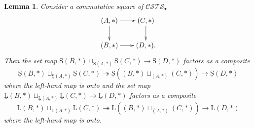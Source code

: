 \documentclass[a4paper,12pt]{amsart}
\newtheorem{lem}[thm]{Lemma}
\begin{document}
\begin{lem} \label{aide} Consider a commutative square of ${\mathcal{C\!S\!T\!S}}_\bullet$
\[
\xymatrix@C=2em@R=2em
{
(A,*) {\ar@{->}[r]^-{{}}} {\ar@{->}[d]_-{{}}} & (C,*) {\ar@{->}[d]_-{{}}}\\
(B,*) {\ar@{->}[r]^-{{}}} & (D,*).
}
\]
Then the set map $\operatorname{\underline{S}}(B,*) \sqcup_{\operatorname{\underline{S}}(A,*)} \operatorname{\underline{S}}(C,*) \to \operatorname{\underline{S}}(D,*)$
factors as a composite
\[\operatorname{\underline{S}}(B,*) \sqcup_{\operatorname{\underline{S}}(A,*)} \operatorname{\underline{S}}(C,*) \twoheadrightarrow \operatorname{\underline{S}}((B,*)
\sqcup_{(A,*)} (C,*)) \longrightarrow \operatorname{\underline{S}}(D,*)\] where the left-hand
map is onto and the set map $\operatorname{\underline{L}}(B,*) \sqcup_{\operatorname{\underline{L}}(A,*)} \operatorname{\underline{L}}(C,*) \to
\operatorname{\underline{L}}(D,*)$ factors as a composite
\[\operatorname{\underline{L}}(B,*) \sqcup_{\operatorname{\underline{L}}(A,*)} \operatorname{\underline{L}}(C,*) \twoheadrightarrow \operatorname{\underline{L}}((B,*)
\sqcup_{(A,*)} (C,*)) \longrightarrow \operatorname{\underline{L}}(D,*)\] where the left-hand map is onto.
\end{lem}
\end{document}
